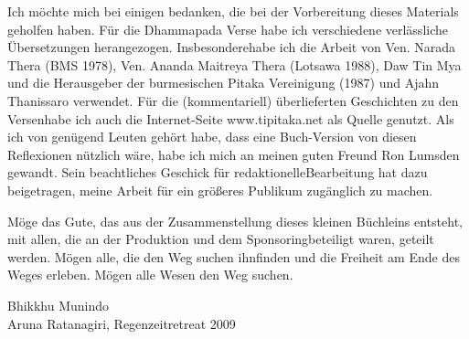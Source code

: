 Ich möchte mich bei einigen bedanken, die bei der
Vorbereitung dieses Materials geholfen haben. 
Für die Dhammapada Verse habe ich verschiedene verlässliche
Übersetzungen herangezogen. 
Insbesondere\linebreak habe ich die
Arbeit von Ven. Narada Thera (BMS 1978), Ven. Ananda Maitreya Thera (Lotsawa 1988), Daw Tin Mya und die Herausgeber der burmesischen Pitaka Vereinigung (1987)
und Ajahn Thanissaro verwendet. 
Für die (kommentariell) überlieferten Geschichten zu den Versen\linebreak habe ich auch die
Internet-Seite www.tipitaka.net als Quelle genutzt.
Als ich von genügend Leuten gehört habe, dass eine
Buch-Version von diesen Reﬂexionen nützlich wäre, habe
ich mich an meinen guten Freund Ron Lumsden gewandt.
Sein beachtliches Geschick für redaktionelle\linebreak Bearbeitung
hat dazu beigetragen, meine Arbeit für ein größeres Publikum zugänglich zu machen.

Möge das Gute, das aus der Zusammenstellung dieses kleinen Büchleins entsteht, mit allen, die an der Produktion und dem Sponsoring\linebreak beteiligt waren, geteilt werden.  Mögen alle, die den Weg suchen ihn\linebreak ﬁnden und die Freiheit am Ende des Weges erleben.  Mögen alle Wesen den Weg suchen.



{\par\raggedleft
Bhikkhu Munindo\\
Aruna Ratanagiri, Regenzeitretreat 2009
\par}

